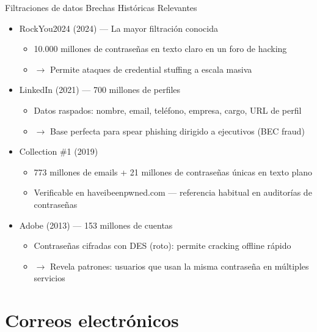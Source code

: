 \documentclass[aspectratio=169,11pt]{beamer}
\begin{document}
\begin{frame}[allowframebreaks]{Filtraciones de datos}
\small
Brechas Históricas Relevantes
  \begin{itemize}
  \item RockYou2024 (2024) --- La mayor filtración conocida
  \begin{itemize}
  \item 10.000 millones de contraseñas en texto claro en un foro de hacking
  \item $\rightarrow$ Permite ataques de credential stuffing a escala masiva
    \end{itemize}

  \item LinkedIn (2021) --- 700 millones de perfiles
    \begin{itemize}

  \item Datos raspados: nombre, email, teléfono, empresa, cargo, URL de perfil
  \item $\rightarrow$ Base perfecta para spear phishing dirigido a ejecutivos (BEC fraud)
      \end{itemize}

  \item Collection \#1 (2019)
    \begin{itemize}

  \item 773 millones de emails + 21 millones de contraseñas únicas en texto plano
  \item Verificable en haveibeenpwned.com --- referencia habitual en auditorías de contraseñas
        \end{itemize}

  \item Adobe (2013) --- 153 millones de cuentas
      \begin{itemize}

  \item Contraseñas cifradas con DES (roto): permite cracking offline rápido
  \item $\rightarrow$ Revela patrones: usuarios que usan la misma contraseña en múltiples servicios
  
          \end{itemize}

  \end{itemize}
\end{frame}

\section{Correos electrónicos}
\end{document}
